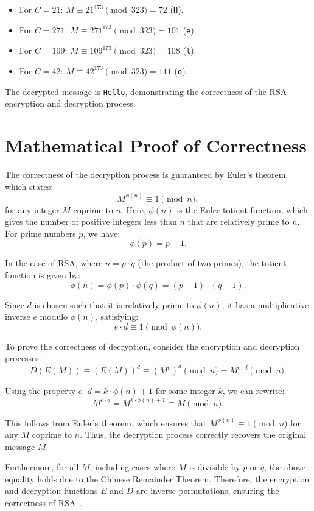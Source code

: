 \documentclass[12pt,a4paper]{report}
\begin{document}
\begin{itemize}
    \item For \( C = 21 \): \( M \equiv 21^{173} \pmod{323} = 72 \) (\texttt{H}).
    \item For \( C = 271 \): \( M \equiv 271^{173} \pmod{323} = 101 \) (\texttt{e}).
    \item For \( C = 109 \): \( M \equiv 109^{173} \pmod{323} = 108 \) (\texttt{l}).
    \item For \( C = 42 \): \( M \equiv 42^{173} \pmod{323} = 111 \) (\texttt{o}).
\end{itemize}

The decrypted message is \texttt{Hello}, demonstrating the correctness of the RSA encryption and decryption process.

\section{Mathematical Proof of Correctness}
The correctness of the decryption process is guaranteed by Euler's theorem, which states:
\[
M^{\phi(n)} \equiv 1 \pmod{n},
\]
for any integer \( M \) coprime to \( n \). Here, \( \phi(n) \) is the Euler totient function, which gives the number of positive integers less than \( n \) that are relatively prime to \( n \). For prime numbers \( p \), we have:
\[
\phi(p) = p - 1.
\]

In the case of RSA, where \( n = p \cdot q \) (the product of two primes), the totient function is given by:
\[
\phi(n) = \phi(p) \cdot \phi(q) = (p - 1) \cdot (q - 1).
\]

Since \( d \) is chosen such that it is relatively prime to \( \phi(n) \), it has a multiplicative inverse \( e \) modulo \( \phi(n) \), satisfying:
\[
e \cdot d \equiv 1 \pmod{\phi(n)}.
\]

To prove the correctness of decryption, consider the encryption and decryption processes:
\[
D(E(M)) \equiv (E(M))^d \equiv (M^e)^d \pmod{n} = M^{e \cdot d} \pmod{n}.
\]

Using the property \( e \cdot d = k \cdot \phi(n) + 1 \) for some integer \( k \), we can rewrite:
\[
M^{e \cdot d} = M^{k \cdot \phi(n) + 1} \equiv M \pmod{n}.
\]

This follows from Euler's theorem, which ensures that \( M^{\phi(n)} \equiv 1 \pmod{n} \) for any \( M \) coprime to \( n \). Thus, the decryption process correctly recovers the original message \( M \).

Furthermore, for all \( M \), including cases where \( M \) is divisible by \( p \) or \( q \), the above equality holds due to the Chinese Remainder Theorem. Therefore, the encryption and decryption functions \( E \) and \( D \) are inverse permutations, ensuring the correctness of RSA~\cite{Rivest1978}.
\end{document}
